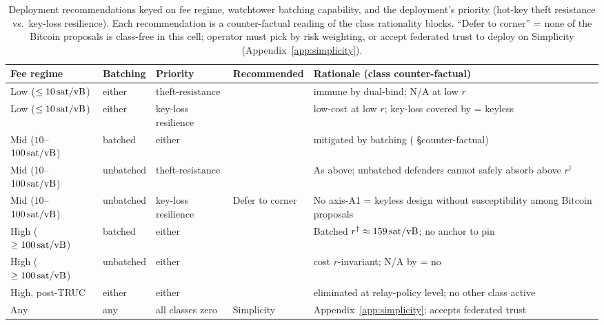 \begin{table}[t]
\centering
\caption{Deployment recommendations keyed on fee regime, watchtower
batching capability, and the deployment's priority (hot-key theft
resistance vs.\ key-loss resilience). Each recommendation is a
counter-factual reading of the class rationality blocks. ``Defer
to corner'' = none of the Bitcoin proposals is
class-free in this cell; operator must pick by risk weighting, or
accept federated trust to deploy on Simplicity
(Appendix~\ref{app:simplicity}).}
\label{tab:deployment}
\footnotesize
\setlength{\tabcolsep}{2.5pt}
\renewcommand{\arraystretch}{1.15}
\begin{tabular}{@{}lllll@{}}
\toprule
Fee regime                           & Batching        & Priority              & Recommended    & Rationale (class counter-factual)                                                   \\
\midrule
Low ($\leq 10\text{\,sat/vB}{}$)              & either          & theft-resistance      & \catcsfs{}     & \classhot{} immune by \axwdbind{} dual-bind; \classscale{} N/A at low $r$           \\
Low ($\leq 10\text{\,sat/vB}{}$)              & either          & key-loss resilience   & \opccv{}       & \classgrief{} low-cost at low $r$; key-loss covered by \axauth{} = keyless          \\
Mid ($10$--$100\text{\,sat/vB}{}$)            & batched         & either                & \opvault{}     & \classscale{} mitigated by batching (\classscale{} §counter-factual)                \\
Mid ($10$--$100\text{\,sat/vB}{}$)            & unbatched       & theft-resistance      & \catcsfs{}     & As above; unbatched defenders cannot safely absorb \classscale{} above $r^\dagger$  \\
Mid ($10$--$100\text{\,sat/vB}{}$)            & unbatched       & key-loss resilience   & Defer to corner & No axis-A1 = keyless design without \classscale{} susceptibility among Bitcoin proposals \\
High ($\geq 100\text{\,sat/vB}{}$)            & batched         & either                & \opvault{}     & Batched $r^\dagger \approx 159\text{\,sat/vB}{}$; no anchor to pin                           \\
High ($\geq 100\text{\,sat/vB}{}$)            & unbatched       & either                & \opctv{}       & \classfee{} cost $r$-invariant; \classscale{} N/A by \axrevault{} = no              \\
High, post-TRUC~\cite{TRUC}          & either          & either                & \opctv{}       & \classfee{} eliminated at relay-policy level; no other class active                 \\
Any                                  & any             & all classes zero      & Simplicity     & Appendix~\ref{app:simplicity}; accepts federated trust                              \\
\bottomrule
\end{tabular}
\end{table}

